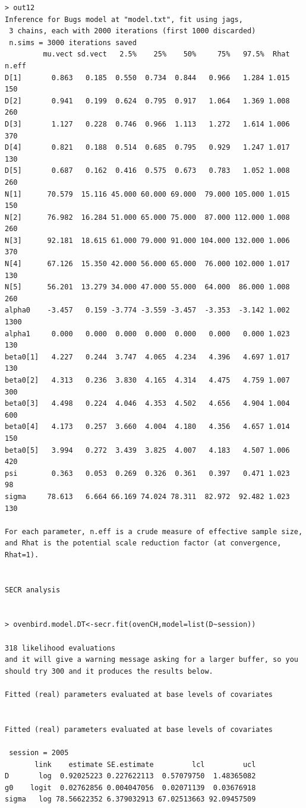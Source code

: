 \begin{verbatim}
> out12
Inference for Bugs model at "model.txt", fit using jags,
 3 chains, each with 2000 iterations (first 1000 discarded)
 n.sims = 3000 iterations saved
         mu.vect sd.vect   2.5%    25%    50%     75%   97.5%  Rhat n.eff
D[1]       0.863   0.185  0.550  0.734  0.844   0.966   1.284 1.015   150
D[2]       0.941   0.199  0.624  0.795  0.917   1.064   1.369 1.008   260
D[3]       1.127   0.228  0.746  0.966  1.113   1.272   1.614 1.006   370
D[4]       0.821   0.188  0.514  0.685  0.795   0.929   1.247 1.017   130
D[5]       0.687   0.162  0.416  0.575  0.673   0.783   1.052 1.008   260
N[1]      70.579  15.116 45.000 60.000 69.000  79.000 105.000 1.015   150
N[2]      76.982  16.284 51.000 65.000 75.000  87.000 112.000 1.008   260
N[3]      92.181  18.615 61.000 79.000 91.000 104.000 132.000 1.006   370
N[4]      67.126  15.350 42.000 56.000 65.000  76.000 102.000 1.017   130
N[5]      56.201  13.279 34.000 47.000 55.000  64.000  86.000 1.008   260
alpha0    -3.457   0.159 -3.774 -3.559 -3.457  -3.353  -3.142 1.002  1300
alpha1     0.000   0.000  0.000  0.000  0.000   0.000   0.000 1.023   130
beta0[1]   4.227   0.244  3.747  4.065  4.234   4.396   4.697 1.017   130
beta0[2]   4.313   0.236  3.830  4.165  4.314   4.475   4.759 1.007   300
beta0[3]   4.498   0.224  4.046  4.353  4.502   4.656   4.904 1.004   600
beta0[4]   4.173   0.257  3.660  4.004  4.180   4.356   4.657 1.014   150
beta0[5]   3.994   0.272  3.439  3.825  4.007   4.183   4.507 1.006   420
psi        0.363   0.053  0.269  0.326  0.361   0.397   0.471 1.023    98
sigma     78.613   6.664 66.169 74.024 78.311  82.972  92.482 1.023   130

For each parameter, n.eff is a crude measure of effective sample size,
and Rhat is the potential scale reduction factor (at convergence, Rhat=1).


SECR analysis


> ovenbird.model.DT<-secr.fit(ovenCH,model=list(D~session))

318 likelihood evaluations
and it will give a warning message asking for a larger buffer, so you
should try 300 and it produces the results below.

Fitted (real) parameters evaluated at base levels of covariates 


Fitted (real) parameters evaluated at base levels of covariates 

 session = 2005 
       link    estimate SE.estimate         lcl         ucl
D       log  0.92025223 0.227622113  0.57079750  1.48365082
g0    logit  0.02762856 0.004047056  0.02071139  0.03676918
sigma   log 78.56622352 6.379032913 67.02513663 92.09457509


\end{verbatim}
